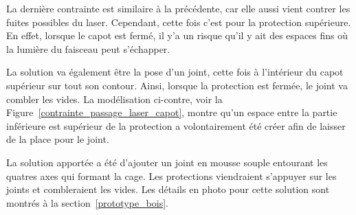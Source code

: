 \begin{minipage}[c]{0.6\textwidth}
    La dernière contrainte est similaire à la précédente, car elle aussi vient contrer les fuites possibles du laser. Cependant, cette fois c'est pour la protection supérieure. En effet, lorsque le capot est fermé, il y'a un risque qu'il y ait des espaces fins où la lumière du faisceau peut s'échapper.

    La solution va également être la pose d'un joint, cette fois à l'intérieur du capot supérieur sur tout son contour. Ainsi, lorsque la protection est fermée, le joint va combler les vides. La modélisation ci-contre, voir la Figure~\ref{contrainte_passage_laser_capot}, montre qu'un espace entre la partie inférieure est supérieur de la protection a volontairement été créer afin de laisser de la place pour le joint.

    La solution apportée a été d'ajouter un joint en mousse souple entourant les quatres axes qui formant la cage. Les protections viendraient s'appuyer sur les joints et combleraient les vides. Les détails en photo pour cette solution sont montrés à la section~\ref{prototype_bois}.
\end{minipage}\hfill
